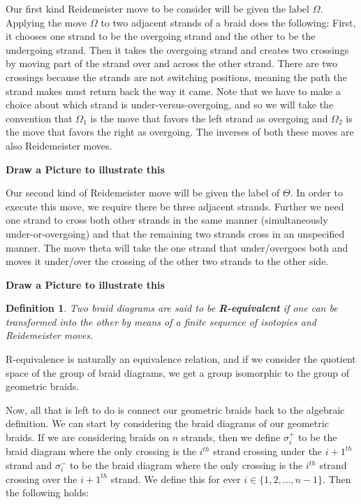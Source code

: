 \documentclass[10pt]{ucthesis}
\newtheorem{definition}{Definition}[chapter]
\begin{document}
Our first kind Reidemeister move to be consider will be given the label $\Omega$. Applying the move $\Omega$ to two adjacent strands of a braid does the following: First, it chooses one strand to be the overgoing strand and the other to be the undergoing strand. Then it takes the overgoing strand and creates two crossings by moving part of the strand over and across the other strand. There are two crossings because the strands are not switching positions, meaning the path the strand makes must return back the way it came. Note that we have to make a choice about which strand is under-versus-overgoing, and so we will take the convention that $\Omega_1$ is the move that favors the left strand as overgoing and $\Omega_2$ is the move that favors the right as overgoing. The inverses of both these moves are also Reidemeister moves.

\textbf{Draw a Picture to illustrate this}

Our second kind of Reidemeister move will be given the label of $\Theta$. In order to execute this move, we require there be three adjacent strands. Further we need one strand to cross both other strands in the same manner (simultaneously under-or-overgoing) and that the remaining two strands cross in an unspecified manner. The move theta will take the one strand that under/overgoes both and moves it under/over the crossing of the other two strands to the other side. 

\textbf{Draw a Picture to illustrate this}

\begin{definition}
	Two braid diagrams are said to be \textbf{R-equivalent} if one can be transformed into the other by means of a finite sequence of isotopies and Reidemeister moves.
\end{definition}

R-equivalence is naturally an equivalence relation, and if we consider the quotient space of the group of braid diagrams, we get a group isomorphic to the group of geometric braids.

Now, all that is left to do is connect our geometric braids back to the algebraic definition. We can start by considering the braid diagrams of our geometric braids. If we are considering braids on $n$ strands, then we define $\sigma_i^+$ to be the braid diagram where the only crossing is the $i^{th}$ strand crossing under the $i+1^{th}$ strand and $\sigma_i^-$ to be the braid diagram where the only crossing is the $i^{th}$ strand crossing over the $i+1^{th}$ strand. We define this for ever $i\in\{1,2,\hdots,n-1\}$. Then the following holds:
\end{document}
